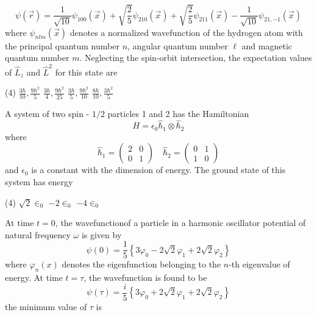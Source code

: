 \begin{questions}
\begin{minipage}{\textwidth}
	$$
	\psi(\vec{r})=\frac{1}{\sqrt{10}} \psi_{100}(\vec{x})+\sqrt{\frac{2}{5}} \psi_{210}(\vec{x})+\sqrt{\frac{2}{5}} \psi_{211}(\vec{x})-\frac{1}{\sqrt{10}} \psi_{21,-1}(\vec{x})
	$$
	where $\psi_{n l m}(\vec{x})$ denotes a normalized wavefunction of the hydrogen atom with the principal quantum number $n$, angular quantum number $\ell$ and magnetic quantum number $m$.
	Neglecting the spin-orbit intersection, the expectation values of $\hat{L}_{z}$ and $\hat{L}^{2}$ for this state are
\end{minipage}
\begin{tasks}(4)
	\task[\textbf{A.}] $\frac{3 \hbar}{10}, \frac{9 \hbar^{2}}{5}$
	\task[\textbf{B.}] $\frac{3 \hbar}{4}, \frac{9 \hbar^{2}}{25}$
	\task[\textbf{C.}]   $\frac{3 \hbar}{5}, \frac{9 \hbar^{2}}{10}$
	\task[\textbf{D.}] $\frac{8 \hbar}{10}, \frac{3 \hbar^{2}}{5}$
\end{tasks}
\begin{minipage}{\textwidth}
	\question A system of two spin - $1 / 2$ particles 1 and 2 has the Hamiltonian
	$$
	H=\epsilon_{0} \hat{\hbar}_{1} \otimes \hat{\hbar}_{2}
	$$
	where
	$$
	\hat{\hbar}_{1}=\left(\begin{array}{ll}
	2 & 0 \\
	0 & 1
	\end{array}\right) \quad \hat{\hbar}_{2}=\left(\begin{array}{ll}
	0 & 1 \\
	1 & 0
	\end{array}\right)
	$$
	and $\epsilon_{0}$ is a constant with the dimension of energy. The ground state of this system has energy
\end{minipage}
\begin{tasks}(4)
	\task[\textbf{A.}] $\sqrt{2} \in_{0}$
	\task[\textbf{C.}] $-2 \in_{0}$
	\task[\textbf{D.}] $-4 \in_{0}$
\end{tasks}
\begin{minipage}{\textwidth}
	\question At time $t=0$, the wavefunctionof a particle in a harmonic oscillator potential of natural frequency $\omega$ is given by
	$$
	\psi(0)=\frac{1}{5}\left\{3 \varphi_{0}-2 \sqrt{2} \varphi_{1}+2 \sqrt{2} \varphi_{2}\right\}
	$$
	where $\varphi_{n}(x)$ denotes the eigenfunction belonging to the $n$-th eigenvalue of energy. At time $t=\tau$, the wavefunction is found to be
	$$
	\psi(\tau)=\frac{i}{5}\left\{3 \varphi_{0}+2 \sqrt{2} \varphi_{1}+2 \sqrt{2} \varphi_{2}\right\}
	$$
	the minimum value of $\tau$ is
\end{minipage}

\end{questions}
